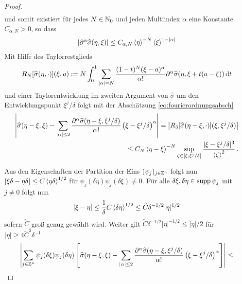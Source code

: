 \begin{proof}
\begin{align*}
\end{align*}
und somit existiert für jedes $N\in\mathbb N_0$ und jeden Multiindex $\alpha$ eine Konstante $C_{\alpha,N}> 0 $, so dass
\begin{align}\label{eq:fourierordnungsabsch}
\lvert\partial ^\alpha \widehat \sigma(\eta,\xi)\rvert \le C_{\alpha,N}\braket{\eta}^{-N}\braket{\xi}^{1-\lvert\alpha\rvert}
\end{align}
Mit Hilfe des Taylorrestglieds
\begin{align*}
R_N[\widehat \sigma(\eta,\cdot)](\xi,a):= N \int_0^1\sum_{\lvert\alpha\rvert = N} \frac{(1-t)^N(\xi-a)^\alpha}{\alpha!}\partial^\alpha\widehat \sigma(\eta,\xi+t(a-\xi))\,\mathrm d t
\end{align*}
und einer Taylorentwicklung im zweiten Argument von $\widehat \sigma$ um den Entwicklungspunkt $\xi^j/\delta$ folgt mit der Abschätzung \eqref{eq:fourierordnungsabsch}
\begin{align*}
\left\lvert\widehat \sigma(\eta-\xi,\xi) - \sum_{\lvert\alpha\rvert \le 2} \frac{\partial ^\alpha\widehat\sigma(\eta-\xi,\xi^j/\delta)}{\alpha!}\left( \xi - \xi^j/\delta\right)^\alpha\right\rvert = \left\lvert R_3[\widehat \sigma(\eta-\xi,\cdot)](\xi,\xi^j/\delta)\right\rvert\\ \le
C_N\braket{\eta-\xi}^{-N}\sup_{\zeta\in[\xi,\xi^j/\delta]}\frac{|\xi-\xi^j/\delta|^3}{\braket{\zeta}^2}\,.
\end{align*}

Aus den Eigenschaften der Partition der Eins $(\psi_j)_{j\in\mathbb Z^n}$ folgt nun $|\xi\delta-\eta\delta|\le C\braket{\eta\delta}^{1/2}$ für $\psi_j(\delta\eta)\psi_j(\delta\xi)\neq 0$. Für alle $\delta\xi,\delta\eta\in\operatorname{supp}\psi_j$ mit $j\neq 0$ folgt nun
\begin{align*}
|\xi -\eta|\le \frac{1}{\delta}C\braket{\delta\eta}^{1/2}\le \widetilde C \delta^{-1/2}|\eta|^{1/2}
\end{align*}
sofern $\widetilde C$ groß genug gewählt wird. Weiter gilt $\widetilde C\delta^{-1/2}|\eta|^{-1/2}\le|\eta|/2$ für $|\eta|\ge 4\widetilde C^2\delta^{-1}$
\begin{align*}
\left\lvert\sum_{j\in\mathbb Z^n} \psi_j(\delta\xi)\psi_j(\delta \eta)\left[
\widehat \sigma(\eta-\xi,\xi) - \sum_{\lvert\alpha\rvert \le 2} \frac{\partial ^\alpha\widehat\sigma(\eta-\xi,\xi^j/\delta)}{\alpha!}\left( \xi - \xi^j/\delta\right)^\alpha
\right]\right\rvert\le \\
\end{align*}


\end{proof}
